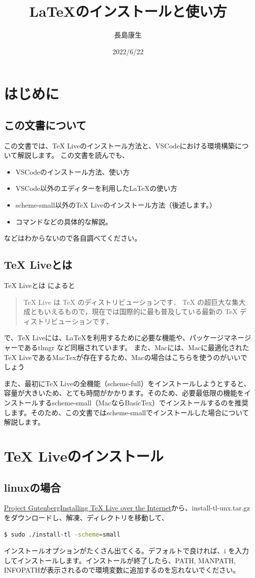 \documentclass[twocolumn]{jarticle}
\title{\large\gt\LaTeX のインストールと使い方}
\author{\normalsize 長島康生}
\affil{\normalsize 慶應義塾大学環境情報学部4年 脇田研究会}
\date{2022/6/22}
\begin{document}
\maketitle
\section{はじめに}
\subsection{この文書について}
この文書では、TeX Liveのインストール方法と、VSCodeにおける環境構築について解説します。
この文書を読んでも、
\begin{itemize}
    \item VSCodeのインストール方法、使い方
    \item VSCode以外のエディターを利用した\LaTeX の使い方
    \item scheme-small以外のTeX Liveのインストール方法（後述します。）
    \item コマンドなどの具体的な解説。
\end{itemize}
などはわからないので各自調べてください。
\subsection{TeX Liveとは}
TeX Liveとは\cite[TeX Wiki]{TexLive} によると
\begin{quotation}
    TeX Live は TeX のディストリビューションです． TeX の超巨大な集大成ともいえるもので，現在では国際的に最も普及している最新の TeX ディストリビューションです．
\end{quotation}
で、TeX Liveには、\LaTeX を利用するために必要な機能や、パッケージマネージャーであるtlmgr など同梱されています。
また、Macには、Macに最適化されたTeX LiveであるMacTexが存在するため、Macの場合はこちらを使うのがいいでしょう

また、最初にTeX Liveの全機能（scheme-full）をインストールしようとすると、容量が大きいため、とても時間がかかります。そのため、必要最低限の機能をインストールするscheme-small（MacならBasicTex）でインストールするのを推奨します。そのため、この文書ではscheme-smallでインストールした場合について解説します。

\section{TeX Liveのインストール}
\subsection{linuxの場合}
\href{https://www.tug.org/texlive/acquire-netinstall.html}{Project GutenbergInstalling TeX Live over the Internet}から、install-tl-unx.tar.gz をダウンロードし、解凍、ディレクトリを移動して、
\begin{lstlisting}[language=bash]
$ sudo ./install-tl -scheme=small
\end{lstlisting}
インストールオプションがたくさん出てくる。デフォルトで良ければ、i を入力してインストールします。インストールが終了したら、PATH, MANPATH, INFOPATHが表示されるので環境変数に追加するのを忘れないでください。
\end{document}

